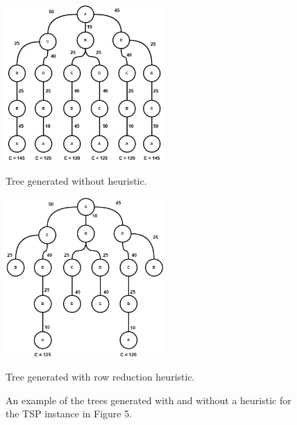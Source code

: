     \begin{figure}[H]
        \begin{minipage}{.5\linewidth}
          \centering
          \begin{center}
            \includegraphics[width=6cm]{images/BnB-TSP-1.jpg}
        \end{center}
        \captionsetup{labelformat=empty}
        \caption{\doublespacing Tree generated without heuristic.}
        \end{minipage}%
        \begin{minipage}{.5\linewidth}
            \centering
            \begin{center}
              \includegraphics[width=6cm]{images/BnB-TSP-2.jpg}
          \end{center}
          \captionsetup{labelformat=empty}
          \caption{\doublespacing Tree generated with row reduction heuristic.}
          \end{minipage}
        \caption{\doublespacing An example of 
        the trees generated with and without a heuristic for the TSP instance in Figure 5.}
    \end{figure}

   
